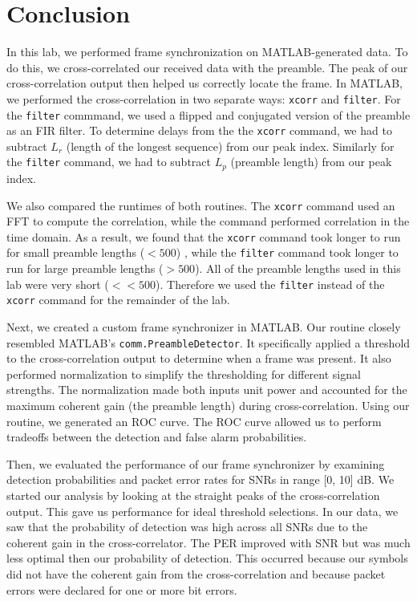 \documentclass{article}
\begin{document}
\section{Conclusion}

In this lab, we performed frame synchronization on MATLAB-generated data. To do this, we cross-correlated our received data with the preamble. The peak of our cross-correlation output then helped us correctly locate the frame. In MATLAB, we performed the cross-correlation in two separate ways: \texttt{xcorr} and \texttt{filter}. For the \texttt{filter} commmand, we used a flipped and conjugated version of the preamble as an FIR filter. To determine delays from the the \texttt{xcorr} command, we had to subtract $L_r$ (length of the longest sequence) from our peak index. Similarly for the \texttt{filter} command, we had to subtract $L_p$ (preamble length) from our peak index.

We also compared the runtimes of both routines. The \texttt{xcorr} command used an FFT to compute the correlation, while the  command performed correlation in the time domain. As a result, we found that the \texttt{xcorr} command took longer to run for small preamble lengths ($ < 500$) , while the \texttt{filter} command took longer to run for large preamble lengths ($ > 500$). All of the preamble lengths used in this lab were very short ($ << 500$). Therefore we used the \texttt{filter} instead of the \texttt{xcorr} command for the remainder of the lab.

Next, we created a custom frame synchronizer in MATLAB. Our routine closely resembled MATLAB's \texttt{comm.PreambleDetector}. It specifically applied a threshold to the cross-correlation output to determine when a frame was present. It also performed normalization to simplify the thresholding for different signal strengths. The normalization made both inputs unit power and accounted for the maximum coherent gain (the preamble length) during cross-correlation. Using our routine, we generated an ROC curve. The ROC curve allowed us to perform tradeoffs between the detection and false alarm probabilities.

Then, we evaluated the performance of our frame synchronizer by examining detection probabilities and packet error rates for SNRs in range [0, 10] dB. We started our analysis by looking at the straight peaks of the cross-correlation output. This gave us performance for ideal threshold selections. In our data, we saw that the probability of detection was high across all SNRs due to the coherent gain in the cross-correlator. The PER improved with SNR but was much less optimal then our probability of detection. This occurred because our symbols did not have the coherent gain from the cross-correlation and because packet errors were declared for one or more bit errors.
\end{document}
